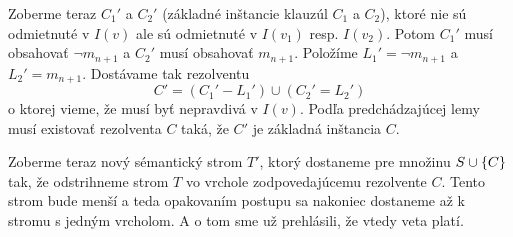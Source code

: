\begin{dokaz}
\begin{itemize}
        Zoberme teraz $C_1'$ a $C_2'$
        (základné inštancie klauzúl $C_1$ a $C_2$), ktoré nie sú
        odmietnuté v $I(v)$ ale sú odmietnuté v $I(v_1)$ resp.
        $I(v_2)$. Potom $C_1'$ musí obsahovať $\neg m_{n+1}$ a
        $C_2'$ musí obsahovať $m_{n+1}$. Položíme
        $L_1' = \neg m_{n+1}$ a $L_2' = m_{n+1}$. Dostávame tak
        rezolventu 
        \begin{equation*}
            C' = (C_1' - L_1') \cup (C_2' = L_2')
        \end{equation*}
        o ktorej vieme, že musí byť nepravdivá v $I(v)$.
        Podľa predchádzajúcej lemy musí existovať rezolventa $C$ taká,
        že $C'$ je základná inštancia $C$.

        Zoberme teraz nový sémantický strom $T'$, ktorý dostaneme
        pre množinu $S \cup \{ C \}$ tak, že odstrihneme strom $T$
        vo vrchole zodpovedajúcemu rezolvente $C$.
        Tento strom bude menší a teda
        opakovaním postupu sa nakoniec dostaneme až k stromu s jedným
        vrcholom. A o tom sme už prehlásili, že vtedy veta platí.
    \end{itemize}
\end{dokaz}

